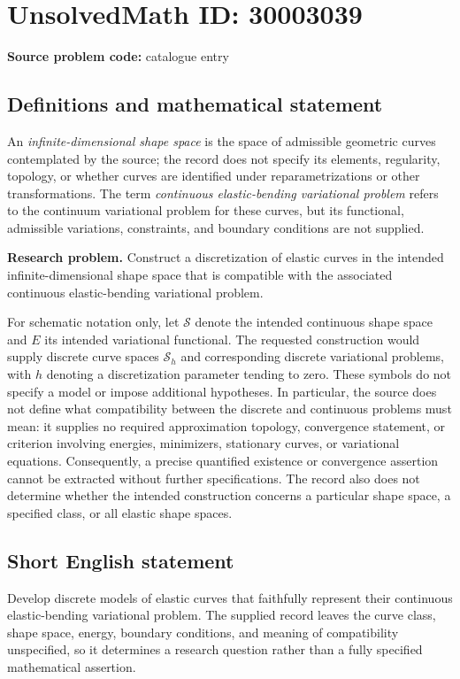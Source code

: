 \documentclass[11pt]{article}
\begin{document}
\section*{UnsolvedMath ID: 30003039}
\textbf{Source problem code:} catalogue entry
\subsection{Definitions and mathematical statement}
An \emph{infinite-dimensional shape space} is the space of admissible geometric curves contemplated by the source; the record does not specify its elements, regularity, topology, or whether curves are identified under reparametrizations or other transformations. The term \emph{continuous elastic-bending variational problem} refers to the continuum variational problem for these curves, but its functional, admissible variations, constraints, and boundary conditions are not supplied.

\textbf{Research problem.} Construct a discretization of elastic curves in the intended infinite-dimensional shape space that is compatible with the associated continuous elastic-bending variational problem.

For schematic notation only, let \(\mathcal S\) denote the intended continuous shape space and \(E\) its intended variational functional. The requested construction would supply discrete curve spaces \(\mathcal S_h\) and corresponding discrete variational problems, with \(h\) denoting a discretization parameter tending to zero. These symbols do not specify a model or impose additional hypotheses. In particular, the source does not define what compatibility between the discrete and continuous problems must mean: it supplies no required approximation topology, convergence statement, or criterion involving energies, minimizers, stationary curves, or variational equations. Consequently, a precise quantified existence or convergence assertion cannot be extracted without further specifications. The record also does not determine whether the intended construction concerns a particular shape space, a specified class, or all elastic shape spaces.
\subsection{Short English statement}
Develop discrete models of elastic curves that faithfully represent their continuous elastic-bending variational problem. The supplied record leaves the curve class, shape space, energy, boundary conditions, and meaning of compatibility unspecified, so it determines a research question rather than a fully specified mathematical assertion.
\end{document}
